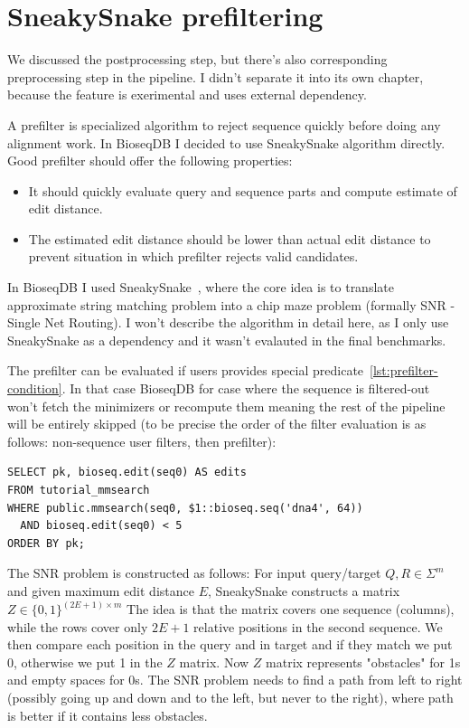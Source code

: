 \clearpage
\section{SneakySnake prefiltering}
\label{sec:prefilter-role}
\label{sec:prefilter-sneakysnake}

We discussed the postprocessing step, but there's also corresponding preprocessing step in the pipeline. I didn't separate it into its own chapter, because
the feature is exerimental and uses external dependency.

A prefilter is specialized algorithm to reject sequence quickly before doing any alignment work.
In BioseqDB I decided to use SneakySnake algorithm directly. Good prefilter should offer the following properties:
\begin{itemize}
  \item It should quickly evaluate query and sequence parts and compute estimate of edit distance.
  \item The estimated edit distance should be lower than actual edit distance to prevent situation in which prefilter rejects valid candidates.
\end{itemize}

In BioseqDB I used SneakySnake~\cite{sneakysnake_paper,sneakysnake_readme}, where the core idea is to translate approximate string matching problem into a chip maze problem
(formally SNR - Single Net Routing). I won't describe the algorithm in detail here, as I only use SneakySnake as a dependency and it wasn't evalauted in the final benchmarks.

The prefilter can be evaluated if users provides special predicate~\ref{lst:prefilter-condition}. In that case BioseqDB for case where the sequence is filtered-out
won't fetch the minimizers or recompute them meaning the rest of the pipeline will be entirely skipped (to be precise the order of the filter evaluation is as follows:
non-sequence user filters, then prefilter):
\begin{minipage}{\linewidth}
\begin{lstlisting}[style=bioseq-walk-sql]
SELECT pk, bioseq.edit(seq0) AS edits
FROM tutorial_mmsearch
WHERE public.mmsearch(seq0, $1::bioseq.seq('dna4', 64))
  AND bioseq.edit(seq0) < 5
ORDER BY pk;
\end{lstlisting}
\end{minipage}

The SNR problem is constructed as follows: For input query/target \(Q,R\in\Sigma^m\) and given maximum edit distance $E$, SneakySnake constructs a
 matrix $Z \in \{0,1\}^{(2E+1)\times m}$
The idea is that the matrix covers one sequence (columns), while the rows cover only $2E+1$ relative positions in the second sequence.
We then compare each position in the query and in target and if they match we put 0, otherwise we put 1 in the $Z$ matrix.
Now $Z$ matrix represents "obstacles" for 1s and empty spaces for 0s. The SNR problem needs to find a path from left to right (possibly going up and down and to the left, but never to the right),
where path is better if it contains less obstacles.

